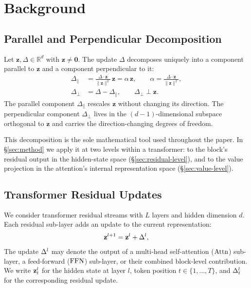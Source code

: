 \section{Background}
\label{sec:background}

\subsection{Parallel and Perpendicular Decomposition}
\label{sec:decomp}

Let $\mathbf{z}, \Delta \in \mathbb{R}^d$ with $\mathbf{z} \neq \mathbf{0}$.
The update $\Delta$ decomposes uniquely into a component parallel to
$\mathbf{z}$ and a component perpendicular to it:
\begin{align}
  \Delta_\parallel
    &= \frac{\Delta \cdot \mathbf{z}}{\|\mathbf{z}\|^2}\,\mathbf{z}
     = \alpha\,\mathbf{z},
     \qquad
     \alpha = \frac{\Delta \cdot \mathbf{z}}{\|\mathbf{z}\|^2},
  \label{eq:para} \\
  \Delta_\perp
    &= \Delta - \Delta_\parallel,
    \qquad \Delta_\perp \perp \mathbf{z}.
  \label{eq:perp}
\end{align}
The parallel component $\Delta_\parallel$ rescales $\mathbf{z}$ without
changing its direction. The perpendicular component $\Delta_\perp$ lives in
the $(d-1)$-dimensional subspace orthogonal to $\mathbf{z}$ and carries the
direction-changing degrees of freedom.

This decomposition is the sole mathematical tool used throughout the paper.
In \S\ref{sec:method} we apply it at two levels within a transformer:
to the block's residual output in the hidden-state space (\S\ref{sec:residual-level}),
and to the value projection in the attention's internal representation space
(\S\ref{sec:value-level}).

\subsection{Transformer Residual Updates}
\label{sec:transformer}

We consider transformer residual streams with $L$ layers and hidden dimension
$d$. Each residual sub-layer adds an update to the current representation:
\begin{equation}
  \mathbf{z}^{l+1} = \mathbf{z}^{l} + \Delta^{l},
  \label{eq:residual}
\end{equation}
The update $\Delta^{l}$ may denote the output of a multi-head self-attention
($\mathrm{Attn}$) sub-layer, a feed-forward ($\mathrm{FFN}$) sub-layer, or their combined
block-level contribution.
We write $\mathbf{z}^{l}_{t}$ for the hidden state at layer $l$, token position
$t \in \{1,\ldots,T\}$, and $\Delta^{l}_{t}$ for the corresponding residual update.

